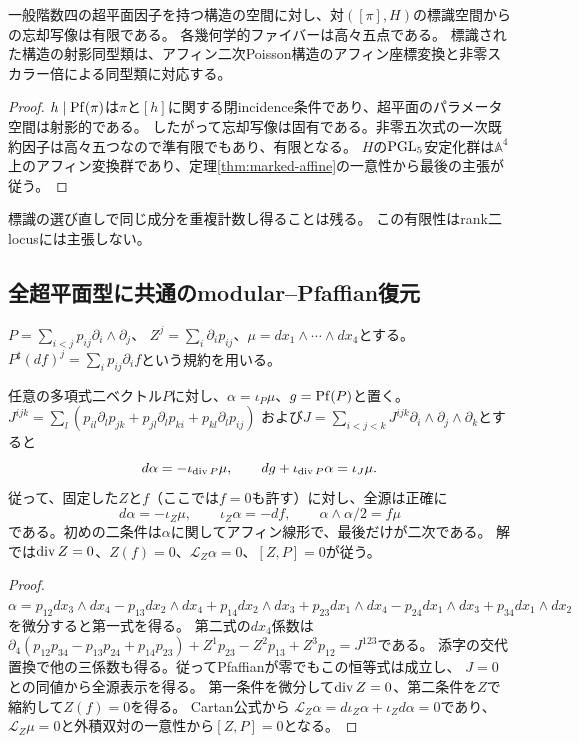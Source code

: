 \begin{proposition}[標識を忘れる際の有限性]\label{prop:finite-mark}
一般階数四の超平面因子を持つ構造の空間に対し、対$([\pi],H)$の標識空間からの忘却写像は有限である。
各幾何学的ファイバーは高々五点である。
標識された構造の射影同型類は、アフィン二次Poisson構造のアフィン座標変換と非零スカラー倍による同型類に対応する。
\end{proposition}
\begin{proof}
$h\mid\operatorname{Pf}(\pi)$は$\pi$と$[h]$に関する閉incidence条件であり、超平面のパラメータ空間は射影的である。
したがって忘却写像は固有である。非零五次式の一次既約因子は高々五つなので準有限でもあり、有限となる。
$H$の$\operatorname{PGL}_5$安定化群は$\mathbb A^4$上のアフィン変換群であり、定理\ref{thm:marked-affine}の一意性から最後の主張が従う。
\end{proof}
標識の選び直しで同じ成分を重複計数し得ることは残る。
この有限性はrank二locusには主張しない。

\subsection{全超平面型に共通のmodular--Pfaffian復元}
$P=\sum_{i<j}p_{ij}\partial_i\wedge\partial_j$、
$Z^j=\sum_i\partial_ip_{ij}$、$\mu=dx_1\wedge\cdots\wedge dx_4$とする。
$P^\sharp(df)^j=\sum_i p_{ij}\partial_if$という規約を用いる。

\begin{proposition}[modular原始関数による全源の判定]\label{prop:modular-primitive}
任意の多項式二ベクトル$P$に対し、$\alpha=\iota_P\mu$、$g=\operatorname{Pf}(P)$と置く。
$J^{ijk}=\sum_l(p_{il}\partial_lp_{jk}+p_{jl}\partial_lp_{ki}+p_{kl}\partial_lp_{ij})$
および$J=\sum_{i<j<k}J^{ijk}\partial_i\wedge\partial_j\wedge\partial_k$とすると
\begin{equation}
 d\alpha=-\iota_{\operatorname{div} P}\mu,\qquad
 dg+\iota_{\operatorname{div} P}\alpha=\iota_J\mu.\label{eq:primitive-identity}
\end{equation}
従って、固定した$Z$と$f$（ここでは$f=0$も許す）に対し、全源は正確に
\begin{equation}
 d\alpha=-\iota_Z\mu,\qquad
 \iota_Z\alpha=-df,\qquad
 \alpha\wedge\alpha/2=f\mu                         \label{eq:primitive-source}
\end{equation}
である。初めの二条件は$\alpha$に関してアフィン線形で、最後だけが二次である。
解では$\operatorname{div} Z=0$、$Z(f)=0$、$\mathcal L_Z\alpha=0$、$[Z,P]=0$が従う。
\end{proposition}
\begin{proof}
$\alpha=p_{12}dx_3\wedge dx_4-p_{13}dx_2\wedge dx_4
+p_{14}dx_2\wedge dx_3+p_{23}dx_1\wedge dx_4
-p_{24}dx_1\wedge dx_3+p_{34}dx_1\wedge dx_2$を微分すると第一式を得る。
第二式の$dx_4$係数は
$\partial_4(p_{12}p_{34}-p_{13}p_{24}+p_{14}p_{23})
+Z^1p_{23}-Z^2p_{13}+Z^3p_{12}=J^{123}$である。
添字の交代置換で他の三係数も得る。従ってPfaffianが零でもこの恒等式は成立し、
$J=0$との同値から全源表示を得る。
第一条件を微分して$\operatorname{div} Z=0$、第二条件を$Z$で縮約して$Z(f)=0$を得る。
Cartan公式から
$\mathcal L_Z\alpha=d\iota_Z\alpha+\iota_Zd\alpha=0$であり、
$\mathcal L_Z\mu=0$と外積双対の一意性から$[Z,P]=0$となる。
\end{proof}

